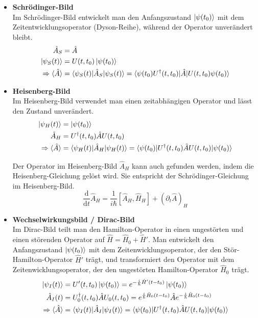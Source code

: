 \documentclass{article}
\newcommand{\diff}{\mathrm{d}}
\begin{document}
\begin{itemize}
	\item \textbf{Schrödinger-Bild}\\
	Im Schrödinger-Bild entwickelt man den Anfangszustand $\ket{\psi(t_0)}$ mit dem Zeitentwicklungsoperator (Dyson-Reihe), während der Operator unverändert bleibt.
		\begin{align}
			\hat{A}_S &= \hat{A} \\
			\ket{\psi_S(t)} &= U(t,t_0) \ket{\psi(t_0)} \\
			\Rightarrow \braket{\hat{A}} &= \braket{\psi_S(t) | \hat{A}_S | \psi_S(t)} = \braket{ \psi(t_0) U^\dagger(t,t_0) | \hat{A} | U(t,t_0) \psi(t_0) }  \notag
		\end{align}


	\item \textbf{Heisenberg-Bild}\\
	Im Heisenberg-Bild verwendet man einen zeitabhängigen Operator und lässt den Zustand unverändert.
		\begin{align}
			\ket{\psi_H(t)} &= \ket{\psi(t_0)} \\
			\hat{A}_H &= U^\dagger(t,t_0) \hat{A} U(t,t_0) \\
			\Rightarrow \braket{\hat{A}} &= \braket{\psi_H(t) | \hat{A}_H | \psi_H(t)} = \braket{ \psi(t_0) | U^\dagger(t,t_0) \hat{A} U(t,t_0) | \psi(t_0) } \notag
		\end{align}

\textcolor{gruen}{Der Operator im Heisenberg-Bild $\hat{A}_H$ kann auch gefunden werden, indem die Heisenberg-Gleichung gelöst wird. Sie entspricht der Schrödinger-Gleichung im Heisenberg-Bild.
		\begin{equation}
			\frac{\diff}{\diff t}\hat{A}_H = \frac{1}{i\hbar} [\hat{A}_H,\hat{H}_H] + (\partial_t \hat{A})_H
		\end{equation}
}


	\item \textbf{Wechselwirkungsbild / Dirac-Bild}\\
	Im Dirac-Bild teilt man den Hamilton-Operator in einen ungestörten und einen störenden Operator auf $\hat{H} = \hat{H}_0 + \hat{H}'$. Man entwickelt  den Anfangszustand $\ket{\psi(t_0)}$ mit dem Zeitenwicklungsoperator, der den Stör-Hamilton-Operator $\hat{H}'$ trägt, und transformiert den Operator mit dem Zeitenwicklungsoperator, der den ungestörten Hamilton-Operator $\hat{H}_0$ trägt.
		\begin{align}
			\ket{\psi_I(t)} &= U'(t,t_0) \ket{\psi(t_0)} = e^{-\frac{i}{\hbar} \hat{H}'(t-t_0)} \ket{\psi(t_0)} \\
			\hat{A}_I(t) &= U_0^\dagger(t,t_0) \hat{A} U_0(t,t_0) = e^{\frac{i}{\hbar} \hat{H}_0(t-t_0)} \hat{A} e^{-\frac{i}{\hbar} \hat{H}_0(t-t_0)} \\
			\Rightarrow \braket{\hat{A}} &= \braket{\psi_I(t) | \hat{A}_I | \psi_I(t)} = \braket{ \psi(t_0) | U^\dagger(t,t_0) \hat{A} U(t,t_0) | \psi(t_0) } \notag
		\end{align}


\end{itemize}
\end{document}

